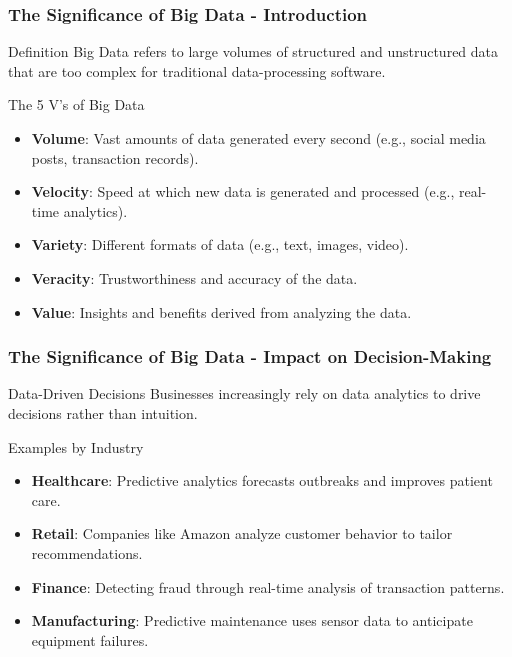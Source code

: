\documentclass{beamer}
\begin{document}
\begin{frame}[fragile]
    \frametitle{The Significance of Big Data - Introduction}
    \begin{block}{Definition}
        Big Data refers to large volumes of structured and unstructured data that are too complex for traditional data-processing software.
    \end{block}
    \begin{block}{The 5 V's of Big Data}
        \begin{itemize}
            \item \textbf{Volume}: Vast amounts of data generated every second (e.g., social media posts, transaction records).
            \item \textbf{Velocity}: Speed at which new data is generated and processed (e.g., real-time analytics).
            \item \textbf{Variety}: Different formats of data (e.g., text, images, video).
            \item \textbf{Veracity}: Trustworthiness and accuracy of the data.
            \item \textbf{Value}: Insights and benefits derived from analyzing the data.
        \end{itemize}
    \end{block}
\end{frame}

\begin{frame}[fragile]
    \frametitle{The Significance of Big Data - Impact on Decision-Making}
    \begin{block}{Data-Driven Decisions}
        Businesses increasingly rely on data analytics to drive decisions rather than intuition.
    \end{block}
    \begin{block}{Examples by Industry}
        \begin{itemize}
            \item \textbf{Healthcare}: Predictive analytics forecasts outbreaks and improves patient care. 
            \item \textbf{Retail}: Companies like Amazon analyze customer behavior to tailor recommendations.
            \item \textbf{Finance}: Detecting fraud through real-time analysis of transaction patterns.
            \item \textbf{Manufacturing}: Predictive maintenance uses sensor data to anticipate equipment failures.
        \end{itemize}
    \end{block}
\end{frame}
\end{document}
